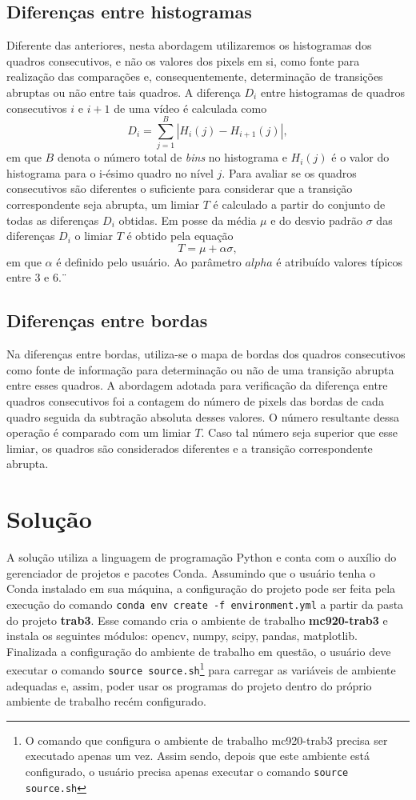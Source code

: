 \documentclass{article}
\begin{document}
%
\subsection{Diferenças entre histogramas}
Diferente das anteriores, nesta abordagem utilizaremos os histogramas dos quadros consecutivos, e não os valores dos pixels em si, como fonte para realização das comparações e, consequentemente, determinação de transições abruptas ou não entre tais quadros. A diferença $D_i$ entre histogramas de quadros consecutivos $i$ e $i+1$ de uma vídeo é calculada como
\[
D_i = \sum_{j=1}^{B} |H_i(j) - H_{i+1}(j)|,
\]
em que $B$ denota o número total de \textit{bins} no histograma e $H_i(j)$ é o valor do histograma para o i-ésimo quadro no nível $j$. Para avaliar se os quadros consecutivos são diferentes o suficiente para considerar que a transição correspondente seja abrupta, um limiar $T$ é calculado a partir do conjunto de todas as diferenças $D_i$ obtidas. Em posse da média $\mu$ e do desvio padrão $\sigma$ das diferenças $D_i$ o limiar $T$ é obtido pela equação
\[
T = \mu + \alpha\sigma,
\]
em que $\alpha$ é definido pelo usuário. Ao parâmetro $alpha$ é atribuído valores típicos entre $3$ e $6$.¨

%
\subsection{Diferenças entre bordas}
Na diferenças entre bordas, utiliza-se o mapa de bordas dos quadros consecutivos como fonte de informação para determinação ou não de uma transição abrupta entre esses quadros. A abordagem adotada para verificação da diferença entre quadros consecutivos foi a contagem do número de pixels das bordas de cada quadro seguida da subtração absoluta desses valores. O número resultante dessa operação é comparado com um limiar $T$. Caso tal número seja superior que esse limiar, os quadros são considerados diferentes e a transição correspondente abrupta. 
%
\section{Solução}
A solução utiliza a linguagem de programação Python e conta com o auxílio do gerenciador de projetos e pacotes Conda. Assumindo que o usuário tenha o Conda instalado em sua máquina, a configuração do projeto pode ser feita pela execução do comando \lstinline{conda env create -f environment.yml} a partir da pasta do projeto \textbf{trab3}. Esse comando cria o ambiente de trabalho \textbf{mc920-trab3} e instala os seguintes módulos: opencv, numpy, scipy, pandas, matplotlib. Finalizada a configuração do ambiente de trabalho em questão, o usuário deve executar o comando \lstinline{source source.sh}\footnote{O comando que configura o ambiente de trabalho mc920-trab3 precisa ser executado apenas um vez. Assim sendo, depois que este ambiente está configurado, o usuário precisa apenas executar o comando \lstinline{source source.sh}} para carregar as variáveis de ambiente adequadas e, assim, poder usar os programas do projeto dentro do próprio ambiente de trabalho recém configurado. 
\end{document}
